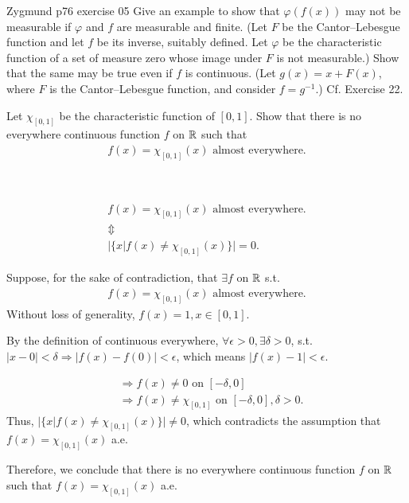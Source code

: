 \documentclass[UTF8,a4paper,10pt]{article}
\begin{document}
  \begin{Problem}[]{Zygmund p76 exercise 05}
    Give an example to show that $\varphi(f(x))$ may not be measurable if $\varphi$ and $f$ are measurable and finite. (Let $F$ be the Cantor–Lebesgue function and let $f$ be its inverse, suitably defined. Let $\varphi$ be the characteristic function of a set of measure zero whose image under $F$ is not measurable.) Show that the same may be true even if $f$ is continuous. (Let $g(x) = x + F(x)$, where $F$ is the Cantor–Lebesgue function, and consider $f = g^{-1}$.) Cf. Exercise 22.

  \end{Problem}

 
\begin{Problem}[]{}

  Let \(\chi_{[0,1]} \) be the characteristic function of \([0,1]\). Show that there is no everywhere continuous function \(f\) on \(\operatorname{\mathbb{R}}\) such that
\begin{equation*}
  \begin{aligned}
    f(x) = \chi_{[0,1]} (x) \,\,\text{almost everywhere.}
  \end{aligned}
\end{equation*}
\end{Problem}

\begin{solution}\,

  \begin{gather*}
    f(x) = \chi_{[0,1]}(x) \text{ almost everywhere.} \\
    \Updownarrow \\
    |\{x | f(x) \neq \chi_{[0,1]}(x)\}| = 0.
  \end{gather*}

\dotfill

  Suppose, for the sake of contradiction, that \(\exists f\) on \(\operatorname{\mathbb{R}}\) s.t. 
  \begin{gather*}
    f(x) = \chi_{[0,1]}(x) \text{ almost everywhere.}
  \end{gather*}
  Without loss of generality, \(f(x) = 1, x\in [0,1]\).

  By the definition of continuous everywhere,
  \(\forall \epsilon>0, \exists \delta>0\), s.t. \(|x-0|<\delta \Rightarrow |f(x)-f(0)|<\epsilon\), which means \(|f(x)-1|<\epsilon\).

  \begin{align*}
    &\Rightarrow f(x) \neq 0 \text{ on } [-\delta, 0] \\
    &\Rightarrow f(x) \neq \chi_{[0,1]} \text{ on } [-\delta, 0], \delta>0.
\end{align*}
Thus, \(|\{x | f(x) \neq \chi_{[0,1]}(x)\}| \neq 0\), which contradicts the assumption that \(f(x) = \chi_{[0,1]}(x) \) a.e.

Therefore, we conclude that there is no everywhere continuous function \(f\) on \(\operatorname{\mathbb{R}}\) such that \(f(x) = \chi_{[0,1]}(x) \) a.e.

\end{solution}
\end{document}
